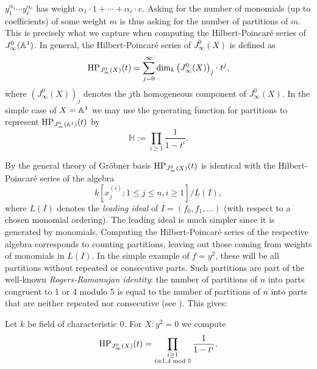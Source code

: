 $y_1^{\alpha_1}\cdots y_e^{\alpha_e}$ has
weight $\alpha_1\cdot 1 + \cdots + \alpha_e\cdot
e$. Asking for the number of monomials (up to coefficients) of some
weight $m$ is thus asking for the number of partitions of $m$. This is 
precisely what we capture when computing the Hilbert-Poincar\'{e} series of
$J_\infty^0(\mathbb{A}^1)$. In general, the Hilbert-Poincar\'{e} series of $J_{\infty}^0(X)$ is defined as
\begin{displaymath}
  \operatorname{HP}_{J_\infty^0(X)}(t) = \sum_{j=0}^\infty \dim_k
  \left(J_\infty^0(X) \right)_j\cdot t^j,
\end{displaymath}
where $\left(J_\infty^0(X) \right)_j$ denotes the $j$th homogeneous
component of $J_\infty^0(X)$. In the simple case of $X=\mathbb{A}^1$ we may use the generating function for partitions to represent
$\operatorname{HP}_{J_\infty^0(\mathbb{A}^1)}(t)$ by 
\begin{displaymath}
  \mathbb{H} := \prod_{i\geq 1} \frac{1}{1-t^i}.
\end{displaymath}  

By the general theory of Gr\"{o}bner basis $\operatorname{HP}_{J_\infty^0(X)}(t)$ is identical with the Hilbert-Poincar\'{e} series of the algebra 
\begin{displaymath}
  k[x_j^{(i)}; 1\leq j \leq n, i\geq 1]/L(I),
\end{displaymath}
where $L(I)$ denotes the \emph{leading ideal} of $I=(f_0,f_1,\ldots)$ (with respect to 
a chosen monomial ordering). The leading ideal is much simpler since
it is generated by monomials. Computing the Hilbert-Poincar\'{e}
series of the respective algebra corresponds to counting partitions, leaving out
those coming from weights of monomials in $L(I)$. In the simple
example of $f=y^2$, these will be all partitions without repeated or
consecutive parts. Such partitions are part of the well-known
\emph{Rogers-Ramanujan identity}: the number of partitions of $n$ into
parts congruent to 1 or 4 modulo 5 is equal to the number of
partitions of $n$ into parts that are neither repeated nor
consecutive (see \cite{andrews_partitions}). This gives:

\begin{Thm*}
Let $k$ be field of characteristic $0$. For $X\colon y^2=0$ we compute
\begin{displaymath}
 \operatorname{HP}_{J_{\infty}^{0}(X)}(t) = \prod_{\substack{i\geq 1 \\ i\equiv
    1,4 \bmod 5}} \frac{1}{1-t^i}.
\end{displaymath}
\end{Thm*}

